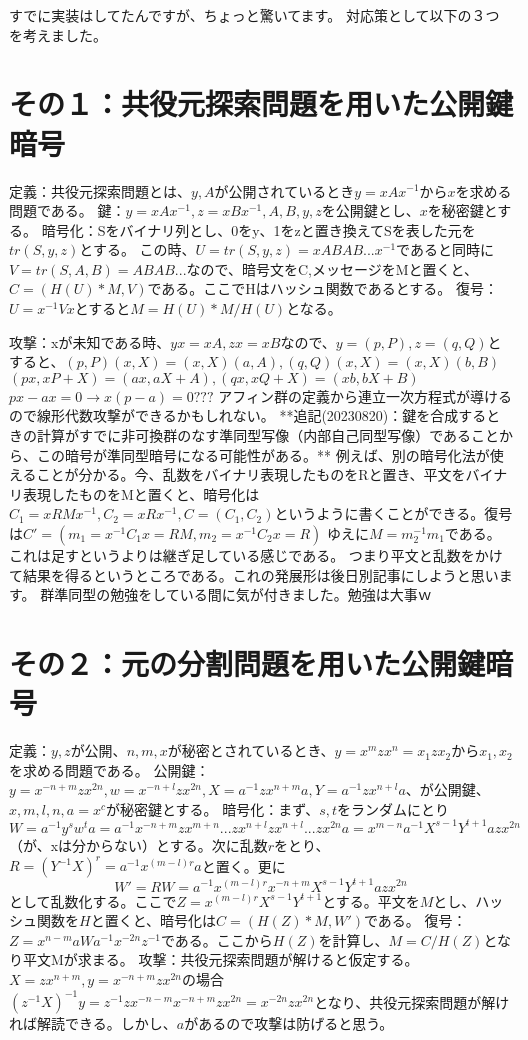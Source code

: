 \documentclass[
]{article}
\begin{document}
すでに実装はしてたんですが、ちょっと驚いてます。
対応策として以下の３つを考えました。
\section{その１：共役元探索問題を用いた公開鍵暗号}
定義：共役元探索問題とは、$y,A$が公開されているとき$y=xAx^{-1}$から$x$を求める問題である。
鍵：$y=xAx^{-1},z=xBx^{-1},A,B,y,z$を公開鍵とし、$x$を秘密鍵とする。
暗号化：Sをバイナリ列とし、0をy、1をzと置き換えてSを表した元を$tr(S,y,z)$とする。
この時、$U=tr(S,y,z)=xABAB...x^{-1}$であると同時に$V=tr(S,A,B)=ABAB...$なので、暗号文をC,メッセージをMと置くと、$C=(H(U)*M,V)$である。ここでHはハッシュ関数であるとする。
復号：$U=x^{-1}Vx$とすると$M=H(U)*M/H(U)$となる。

攻撃：xが未知である時、$yx=xA,zx=xB$なので、$y=(p,P),z=(q,Q)$とすると、$(p,P)(x,X)=(x,X)(a,A),(q,Q)(x,X)=(x,X)(b,B)$
$(px,xP+X)=(ax,aX+A),(qx,xQ+X)=(xb,bX+B)$
$px-ax=0 \rightarrow x(p-a)=0 ???$
アフィン群の定義から連立一次方程式が導けるので線形代数攻撃ができるかもしれない。
**追記(20230820)：鍵を合成するときの計算がすでに非可換群のなす準同型写像（内部自己同型写像）であることから、この暗号が準同型暗号になる可能性がある。**
例えば、別の暗号化法が使えることが分かる。今、乱数をバイナリ表現したものをRと置き、平文をバイナリ表現したものをMと置くと、暗号化は$C_1=xRMx^{-1},C_2=xRx^{-1},C=(C_1,C_2)$というように書くことができる。復号は$C'=(m_1=x^{-1}C_1x=RM,m_2=x^{-1}C_2x=R)$
ゆえに$M=m_2^{-1}m_1$である。これは足すというよりは継ぎ足している感じである。
つまり平文と乱数をかけて結果を得るというところである。これの発展形は後日別記事にしようと思います。
群準同型の勉強をしている間に気が付きました。勉強は大事ｗ

\section{その２：元の分割問題を用いた公開鍵暗号}
定義：$y,z$が公開、$n,m,x$が秘密とされているとき、$y=x^mzx^n=x_1zx_2$から$x_1,x_2$を求める問題である。  
公開鍵：$y=x^{-n+m}zx^{2n},w=x^{-n+l}zx^{2n},X=a^{-1}zx^{n+m}a,Y=a^{-1}zx^{n+l}a$、が公開鍵、$x,m,l,n,a=x^c$が秘密鍵とする。  
暗号化：まず、$s,t$をランダムにとり$$W=a^{-1}y^sw^ta=a^{-1}x^{-n+m}zx^{m+n}...zx^{n+l}zx^{n+l}...zx^{2n}a=x^{m-n}a^{-1}X^{s-1}Y^{t+1}azx^{2n}$$（が、xは分からない）とする。次に乱数$r$をとり、$R=(Y^{-1}X)^r=a^{-1}x^{(m-l)r}a$と置く。更に$$W'=RW=a^{-1}x^{(m-l)r}x^{-n+m}X^{s-1}Y^{t+1}azx^{2n}$$として乱数化する。ここで$Z=x^{(m-l)r}X^{s-1}Y^{t+1}$とする。平文を$M$とし、ハッシュ関数を$H$と置くと、暗号化は$C=(H(Z)*M,W')$である。
復号：$Z=x^{n-m}aWa^{-1}x^{-2n}z^{-1}$である。ここから$H(Z)$を計算し、$M=C/H(Z)$となり平文Mが求まる。
攻撃：共役元探索問題が解けると仮定する。$X=zx^{n+m},y=x^{-n+m}zx^{2n}$の場合$(z^{-1}X)^{-1}y=z^{-1}zx^{-n-m}x^{-n+m}zx^{2n}=x^{-2n}zx^{2n}$となり、共役元探索問題が解ければ解読できる。しかし、$a$があるので攻撃は防げると思う。
\end{document}
